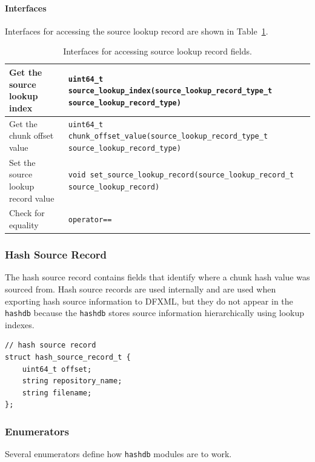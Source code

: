 \documentclass[10pt,twoside]{article}
\newcommand{\hdb}{\texttt{hashdb}\xspace}
\begin{document}
\paragraph{Interfaces}
Interfaces for accessing the source lookup record
are shown in Table~\ref{source-lookup-interfaces}.
\begin{table}[h]
\center
\begin{tabular}{|p{2in}|p{4in}|}
\hline
Get the source lookup index & \texttt{uint64\_t source\_lookup\_index(source\_lookup\_record\_type\_t source\_lookup\_record\_type)} \\
\hline
Get the chunk offset value & \texttt{uint64\_t chunk\_offset\_value(source\_lookup\_record\_type\_t source\_lookup\_record\_type)} \\
\hline
Set the source lookup record value & \texttt{void set\_source\_lookup\_record(source\_lookup\_record\_t source\_lookup\_record)} \\
\hline
Check for equality & \texttt{operator==} \\
\hline
\end{tabular}
\caption{Interfaces for accessing source lookup record fields.\label{source-lookup-interfaces}}
\end{table}

\subsubsection{Hash Source Record}
The hash source record contains fields that identify where a chunk hash value was sourced from.
Hash source records are used internally and are used when exporting hash source information to DFXML,
but they do not appear in the \hdb
because the \hdb stores source information hierarchically using lookup indexes.
\begin{small}
\begin{verbatim}
// hash source record
struct hash_source_record_t {
    uint64_t offset;
    string repository_name;
    string filename;
};
\end{verbatim}
\end{small}

\subsubsection{Enumerators}
Several enumerators define how \hdb modules are to work.
\end{document}
